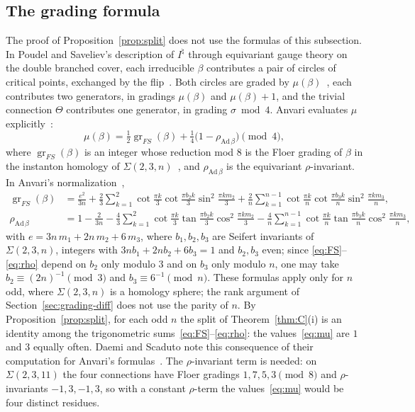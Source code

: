 \documentclass[11pt,reqno]{amsart}
\theoremstyle{plain}
\theoremstyle{definition}
\newcommand{\Inat}{I^{\natural}}
\newcommand{\gr}{\operatorname{gr}}
\newcommand{\Sig}{\Sigma}
\begin{document}
\subsection{The grading formula}
The proof of Proposition~\ref{prop:split} does not use the formulas of this subsection.
In Poudel and Saveliev's description of $\Inat$ through equivariant gauge theory on the double branched
cover, each irreducible
$\beta$ contributes a pair of circles of critical points, exchanged by the flip~\cite[Prop.~4.1(c)]{PS}.
Both circles are graded by $\mu(\beta)$~\cite[Prop.~6.5]{PS}, each contributes two generators, in
gradings $\mu(\beta)$ and $\mu(\beta)+1$, and the trivial connection $\Theta$ contributes one generator, in
grading $\sigma\bmod4$. Anvari evaluates $\mu$ explicitly~\cite[\S6]{Anvari}:
\begin{equation}\label{eq:mu}
\mu(\beta)=\tfrac12\gr_{FS}(\beta)+\tfrac14\bigl(1-\rho_{\mathrm{Ad}\,\beta}\bigr)\pmod 4,
\end{equation}
where $\gr_{FS}(\beta)$ is an integer whose reduction mod $8$ is the Floer grading of $\beta$ in the
instanton homology of $\Sig(2,3,n)$~\cite{FS}, and $\rho_{\mathrm{Ad}\,\beta}$ is the equivariant
$\rho$-invariant. In Anvari's normalization~\cite[(3), Thm.~B]{Anvari},
\begin{align}
\gr_{FS}(\beta)&=\frac{e^2}{3n}+\frac23\sum_{k=1}^{2}\cot\tfrac{\pi k}{3}\cot\tfrac{\pi b_2 k}{3}
\sin^2\tfrac{\pi k m_2}{3}+\frac2n\sum_{k=1}^{n-1}\cot\tfrac{\pi k}{n}\cot\tfrac{\pi b_3 k}{n}
\sin^2\tfrac{\pi k m_3}{n},\label{eq:FS}\\
\rho_{\mathrm{Ad}\,\beta}&=1-\frac{2}{3n}-\frac43\sum_{k=1}^{2}\cot\tfrac{\pi k}{3}\tan\tfrac{\pi b_2 k}{3}
\cos^2\tfrac{\pi k m_2}{3}-\frac4n\sum_{k=1}^{n-1}\cot\tfrac{\pi k}{n}\tan\tfrac{\pi b_3 k}{n}
\cos^2\tfrac{\pi k m_3}{n},\label{eq:rho}
\end{align}
with $e=3n\,m_1+2n\,m_2+6\,m_3$, where $b_1,b_2,b_3$ are Seifert invariants of $\Sig(2,3,n)$, integers with
$3nb_1+2nb_2+6b_3=1$ and $b_2,b_3$ even; since
\eqref{eq:FS}--\eqref{eq:rho} depend on $b_2$ only modulo $3$ and on $b_3$ only modulo $n$, one may take
$b_2\equiv(2n)^{-1}\pmod3$ and $b_3\equiv6^{-1}\pmod n$. These formulas apply only for $n$ odd, where $\Sig(2,3,n)$ is a
homology sphere; the rank argument of Section~\ref{sec:grading-diff} does not use the parity of $n$. By
Proposition~\ref{prop:split}, for each odd $n$ the split of Theorem~\ref{thm:C}(i) is an identity among
the trigonometric sums~\eqref{eq:FS}--\eqref{eq:rho}: the values~\eqref{eq:mu} are $1$ and $3$ equally
often. Daemi and Scaduto note this consequence of their computation for Anvari's
formulas~\cite{DScaduto}. The $\rho$-invariant term is needed: on $\Sig(2,3,11)$ the four connections
have Floer gradings $1,7,5,3\pmod8$ and $\rho$-invariants $-1,3,-1,3$, so with a constant $\rho$-term
the values~\eqref{eq:mu} would be four distinct residues.
\end{document}
